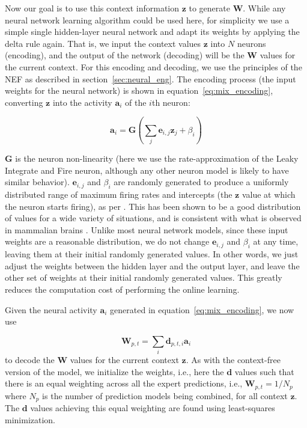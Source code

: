 Now our goal is to use this context information $\mathbf{z}$ to generate $\mathbf{W}$.
While any neural network learning algorithm could be used here, for simplicity we use a simple single hidden-layer neural network and adapt its weights by applying the delta rule again.
That is, we input the context values $\mathbf{z}$ into $N$ neurons (encoding), and the output of the network (decoding) will be the $\mathbf{W}$ values for the current context.
For this encoding and decoding, we use the principles of the \acf{NEF} as described in section~\ref{sec:neural_eng}.
The encoding process (the input weights for the neural network) is shown in equation~\eqref{eq:mix_encoding}, converting $\mathbf{z}$ into the activity $\mathbf{a}_i$ of the $i$th neuron:

\begin{equation}
  \mathbf{a}_{i} = \mathbf{G} \left(\sum_{j} \mathbf{e}_{i,j}\mathbf{z}_j+\beta_i\right)
  \label{eq:mix_encoding}
\end{equation}

$\mathbf{G}$ is the neuron non-linearity (here we use the rate-approximation of the Leaky Integrate and Fire neuron, although any other neuron model is likely to have similar behavior).
$\mathbf{e}_{i,j}$ and $\beta_i$ are randomly generated to produce a uniformly distributed range of maximum firing rates and intercepts (the $\mathbf{z}$ value at which the neuron starts firing), as per \textcite{Eliasmith2013}. 
This has been shown to be a good distribution of values for a wide variety of situations, and is consistent with what is observed in mammalian brains \parencite{Eliasmith2013}.
Unlike most neural network models, since these input weights are a reasonable distribution, we do not change $\mathbf{e}_{i,j}$ and $\beta_i$ at any time, leaving them at their initial randomly generated values.
In other words, we just adjust the weights between the hidden layer and the output layer, and leave the other set of weights at their initial randomly generated values.
This greatly reduces the computation cost of performing the online learning.

Given the neural activity $\mathbf{a}_i$ generated in equation~\eqref{eq:mix_encoding}, we now use 

\begin{equation}
  \mathbf{W}_{p,t} = \sum_{i} \mathbf{d}_{p,t,i}\mathbf{a}_i
  \label{eq:mix_decoding}
\end{equation}
to decode the $\mathbf{W}$ values for the current context $\mathbf{z}$. 
As with the context-free version of the model, we initialize the weights, i.e., here the $\mathbf{d}$ values such that there is an equal weighting across all the expert predictions, i.e., $\mathbf{W}_{p,t} = 1/N_p$ where $N_p$ is the number of prediction models being combined, for all context $\mathbf{z}$.
The $\mathbf{d}$ values achieving this equal weighting are found using least-squares minimization.

